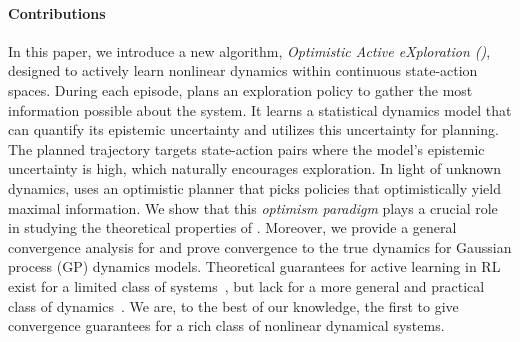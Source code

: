     \paragraph{Contributions}
    In this paper, we introduce a new algorithm, {\em Optimistic Active eXploration (\opacex)}, designed to actively learn nonlinear dynamics within continuous state-action spaces. During each episode, \opacex plans an exploration policy to gather the most information possible about the system. It learns a statistical dynamics model that can quantify its epistemic uncertainty and utilizes this uncertainty for planning. The planned trajectory targets state-action pairs where the model's epistemic uncertainty is high, which naturally encourages exploration. 
    In light of unknown dynamics, \opacex uses an optimistic planner that picks policies that optimistically yield maximal information. We show that this \emph{optimism paradigm} plays a crucial role in studying the theoretical properties of \opacex. Moreover,
 we provide a general convergence analysis for \opacex and prove convergence to the true dynamics for Gaussian process (GP) dynamics models.  Theoretical guarantees for active learning in RL exist for a limited class of systems~\citep{simchowitz2018learning, wagenmaker2020active, mania2020active}, but lack for a more general and practical class of dynamics~\citep{chakraborty2023steering, wagenmaker2023optimal}. 
 We are, to the best of our knowledge, the first to give convergence guarantees for a rich class of nonlinear dynamical systems. 

